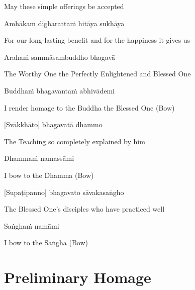 \begin{cprenglish}
May these simple offerings be accepted
\end{cprenglish}

Amhākaṁ dīgharattaṁ hitāya sukhāya

\begin{cprenglish}
For our long-lasting benefit and for the happiness it gives us
\end{cprenglish}

Arahaṁ sammāsambuddho bhagavā

\begin{cprenglish}
The Worthy One the Perfectly Enlightened and Blessed One
\end{cprenglish}

Buddhaṁ bhagavantaṁ abhivādemi\relax

\begin{cprenglish}
I render homage to the Buddha the Blessed One (Bow)
\end{cprenglish}

[Svākkhāto] bhagavatā dhammo

\begin{cprenglish}
The Teaching so completely explained by him
\end{cprenglish}

Dhammaṁ namassāmi\relax

\begin{cprenglish}
I bow to the Dhamma (Bow)
\end{cprenglish}

[Supaṭipanno] bhagavato sāvakasaṅgho

\begin{cprenglish}
The Blessed One’s disciples who have practiced well
\end{cprenglish}

Saṅghaṁ namāmi

\begin{cprenglish}
I bow to the Saṅgha (Bow)
\end{cprenglish}

\section*{Preliminary Homage}

\begin{leader}
\end{leader}
\begin{leader}
\end{leader}

